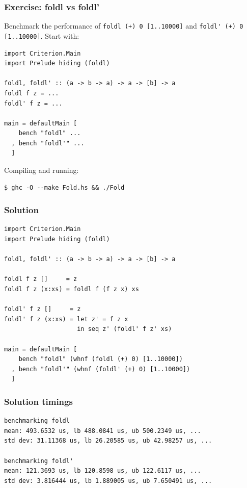 \documentclass{beamer}
\begin{document}
\begin{frame}[fragile]
  \frametitle{Exercise: foldl vs foldl'}

  Benchmark the performance of \lstinline!foldl (+) 0 [1..10000]! and
  \lstinline!foldl' (+) 0 [1..10000]!.  Start with:

  \begin{lstlisting}
import Criterion.Main
import Prelude hiding (foldl)

foldl, foldl' :: (a -> b -> a) -> a -> [b] -> a
foldl f z = ...
foldl' f z = ...
                       
main = defaultMain [
    bench "foldl" ...
  , bench "foldl'" ...
  ]
  \end{lstlisting}

  Compiling and running:
  \begin{verbatim}
$ ghc -O --make Fold.hs && ./Fold
  \end{verbatim}
\end{frame}

\begin{frame}[fragile]
  \frametitle{Solution}

  \begin{lstlisting}
import Criterion.Main
import Prelude hiding (foldl)

foldl, foldl' :: (a -> b -> a) -> a -> [b] -> a

foldl f z []     = z
foldl f z (x:xs) = foldl f (f z x) xs

foldl' f z []     = z
foldl' f z (x:xs) = let z' = f z x
                    in seq z' (foldl' f z' xs)
                       
main = defaultMain [
    bench "foldl" (whnf (foldl (+) 0) [1..10000])
  , bench "foldl'" (whnf (foldl' (+) 0) [1..10000])
  ]
  \end{lstlisting}
\end{frame}

\begin{frame}[fragile]
  \frametitle{Solution timings}

  \begin{verbatim}
benchmarking foldl
mean: 493.6532 us, lb 488.0841 us, ub 500.2349 us, ...
std dev: 31.11368 us, lb 26.20585 us, ub 42.98257 us, ...

benchmarking foldl'
mean: 121.3693 us, lb 120.8598 us, ub 122.6117 us, ...
std dev: 3.816444 us, lb 1.889005 us, ub 7.650491 us, ...
  \end{verbatim}
\end{frame}
\end{document}
